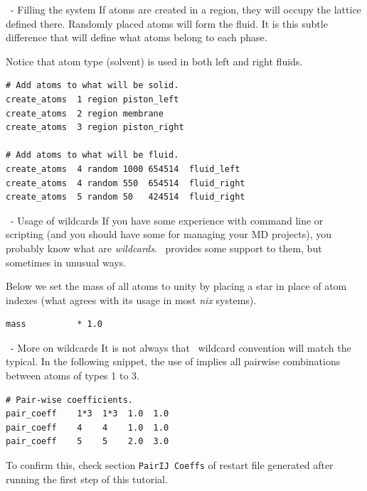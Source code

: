 \begin{frame}[fragile]{\secname}{\subsecname\ - Filling the system}
If atoms are created in a region, they will occupy the lattice defined there.
Randomly placed atoms will form the fluid. It is this subtle difference that will define what atoms belong to each phase.

\vspace{0.5cm}

Notice that atom type  (solvent) is used in both left and right fluids.

\vspace{0.5cm}

\begin{lstlisting}[language=LAMMPS,basicstyle=\tiny]
# Add atoms to what will be solid.
create_atoms  1 region piston_left
create_atoms  2 region membrane
create_atoms  3 region piston_right

# Add atoms to what will be fluid.
create_atoms  4 random 1000 654514  fluid_left
create_atoms  4 random 550  654514  fluid_right
create_atoms  5 random 50   424514  fluid_right
\end{lstlisting}
\end{frame}

\begin{frame}[fragile]{\secname}{\subsecname\ - Usage of wildcards}
If you have some experience with command line or scripting (and you should have some for managing your MD projects), you probably know what are \emph{wildcards}. \LAMMPS\ provides some support to them, but sometimes in unusual ways.

\vspace{0.5cm}

Below we set the mass of all atoms to unity by placing a star \lammpsInline{*} in place of atom indexes (what agrees with its usage in most \emph{nix} systems).

\vspace{0.5cm}

\begin{lstlisting}[language=LAMMPS,basicstyle=\small]
mass          * 1.0
\end{lstlisting}
\end{frame}

\begin{frame}[fragile]{\secname}{\subsecname\ - More on wildcards}
It is not always that \LAMMPS\ wildcard convention will match the typical. In the following snippet, the use of  implies all pairwise combinations between atoms of types 1 to 3.

\vspace{0.5cm}

\begin{lstlisting}[language=LAMMPS,basicstyle=\small]
# Pair-wise coefficients.
pair_coeff    1*3  1*3  1.0  1.0
pair_coeff    4    4    1.0  1.0
pair_coeff    5    5    2.0  3.0
\end{lstlisting}

\vspace{0.5cm}

To confirm this, check section \Verb|PairIJ Coeffs| of restart file generated after running the first step of this tutorial.
\end{frame}


